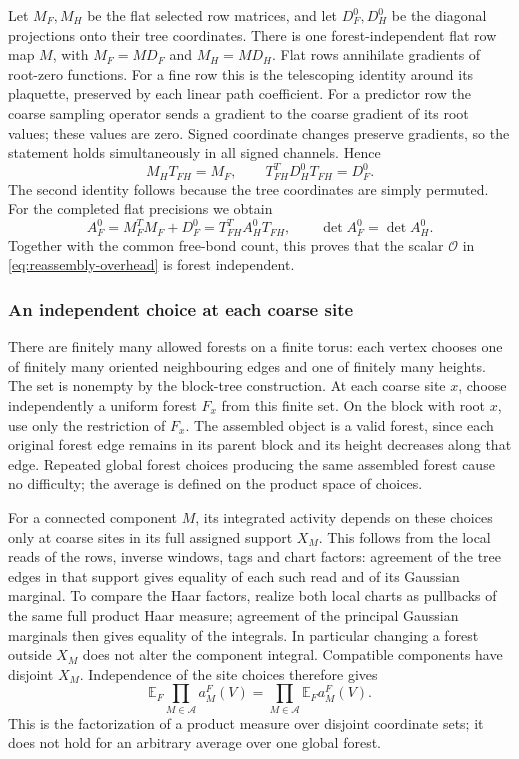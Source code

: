 Let $M_F,M_H$ be the flat selected row matrices, and let $D_F^0,D_H^0$
be the diagonal projections onto their tree coordinates. There is
one forest-independent flat row map $M$, with $M_F=MD_F$ and
$M_H=MD_H$. Flat rows
annihilate gradients of root-zero functions. For a fine row this is
the telescoping identity around its plaquette, preserved by each
linear path coefficient. For a predictor row the coarse sampling
operator sends a gradient to the coarse gradient of its root values;
these values are zero. Signed coordinate changes preserve gradients,
so the statement holds simultaneously in all signed channels. Hence
\[
                 M_HT_{FH}=M_F,
        \qquad T_{FH}^TD_H^0T_{FH}=D_F^0.
\]
The second identity follows because the tree coordinates are simply
permuted. For the completed flat precisions we obtain
\[
 A_F^0=M_F^TM_F+D_F^0=T_{FH}^TA_H^0T_{FH},
                      \qquad \det A_F^0=\det A_H^0.
\]
Together with the common free-bond count, this proves that the scalar
$\mathscr O$ in \eqref{eq:reassembly-overhead} is forest independent.

\subsubsection{An independent choice at each coarse site}
There are finitely many allowed forests on a finite torus: each
vertex chooses one of finitely many oriented neighbouring edges and
one of finitely many heights. The set is nonempty by the block-tree
construction. At each coarse site $x$, choose independently a uniform
forest $F_x$ from this finite set. On the block with root $x$, use
only the restriction of $F_x$. The assembled object is a valid
forest, since each original forest edge remains in its parent block
and its height decreases along that edge. Repeated global forest
choices producing the same assembled forest cause no difficulty;
the average is defined on the product space of choices.

For a connected component $M$, its integrated activity depends on
these choices only at coarse sites in its full assigned support
$X_M$. This follows from the local reads of the rows, inverse
windows, tags and chart factors: agreement of the tree edges in
that support gives equality of each such read and of its Gaussian
marginal. To compare the Haar factors, realize both local charts as
pullbacks of the same full product Haar measure; agreement of the
principal Gaussian marginals then gives equality of the integrals.
In particular changing a forest outside $X_M$ does not
alter the component integral. Compatible components have disjoint
$X_M$. Independence of the site choices therefore gives
\begin{equation}\label{eq:forest-product-average}
 \mathbb E_F\prod_{M\in\mathcal A}a_M^F(V)
                    =\prod_{M\in\mathcal A}\mathbb E_Fa_M^F(V).
\end{equation}
This is the factorization of a product measure over disjoint
coordinate sets; it does not hold for an arbitrary average over
one global forest.

